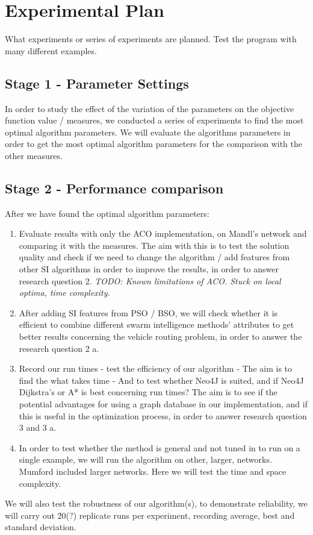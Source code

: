 \section{Experimental Plan}

What experiments or series of experiments are planned. Test the program with many different examples. 

\subsection{Stage 1 - Parameter Settings}

In order to study the effect of the variation of the parameters on the objective function value / measures, we conducted a series of experiments to find the most optimal algorithm parameters. We will evaluate the algorithms parameters in order to get the most optimal algorithm parameters for the comparison with the other measures. 

\subsection{Stage 2 - Performance comparison}

After we have found the optimal algorithm parameters:

\begin{enumerate}

\item Evaluate results with only the ACO implementation, on Mandl's network and comparing it with the measures.  
The aim with this is to test the solution quality and check if we need to change the algorithm / add features from other SI algorithms in order to improve the results, in order to answer research question 2. \emph{\color{red} TODO: Known limitations of ACO. Stuck on local optima, time complexity.}

\item After adding SI features from PSO / BSO, we will check whether it is efficient to combine different swarm intelligence methods' attributes to get better results concerning the vehicle routing problem, in order to answer the research question 2 a.

\item Record our run times - test the efficiency of our algorithm - The aim is to find the what takes time - And to test whether Neo4J is suited, and if Neo4J Dijkstra's or A* is best concerning run times? The aim is to see if the potential advantages for using a graph database in our implementation, and if this is useful in the optimization process, in order to answer research question 3 and 3 a.

\item In order to test whether the method is general and not tuned in to run on a single example, we will run the algorithm on other, larger, networks. Mumford included larger networks. Here we will test the time and space complexity.

\end{enumerate}

We will also test the robustness of our algorithm(s), to demonstrate reliability, we will carry out 20(?) replicate runs per experiment, recording average, best and standard deviation. 


